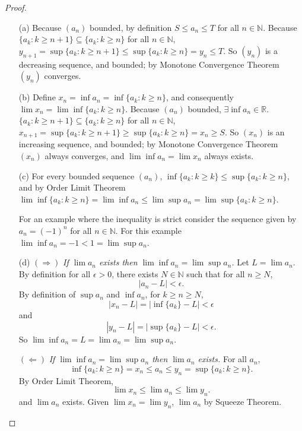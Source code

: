 \documentclass[11pt,twoside, reqno]{amsart}
\theoremstyle{remark}
\def\R{\mathbb R}
\def\N{\mathbb N}
\renewcommand{\implies}{\Rightarrow}
\newcommand{\implied}{\Leftarrow}
\begin{document}
\begin{proof}
\begin{enumerate}
    \item [(a)] Because $(a_n)$ bounded, by definition $S \leq a_n \leq T$ for all $n \in \N$. Because $\{a_k : k \geq n+1\} \subseteq \{a_k : k \geq n\}$ for all $n \in \N$, $y_{n+1} = \sup\{a_k : k \geq n+1\} \leq \sup\{a_k : k \geq n\} = y_n \leq T$. So $(y_n)$ is a decreasing sequence, and bounded; by Monotone Convergence Theorem $(y_n)$ converges.
    \item [(b)] Define $x_n = \inf a_n = \inf \{a_k : k \geq n\}$, and consequently $\lim x_n = \lim \inf \{a_k : k \geq n\}$. Because $(a_n)$ bounded, $\exists \inf a_n \in \R$. $\{a_k : k \geq n+1\} \subseteq \{a_k : k \geq n\}$ for all $n \in \N$, $x_{n+1} = \sup\{a_k : k \geq n+1\} \geq \sup\{a_k : k \geq n\} = x_n \geq S$. So $(x_n)$ is an increasing sequence, and bounded; by Monotone Convergence Theorem $(x_n)$ always converges, and $\lim \inf a_n = \lim x_n$ always exists.
    \item [(c)] For every bounded sequence $(a_n)$, $\inf \{a_k : k \geq k\} \leq \sup \{a_k : k \geq n\}$, and by Order Limit Theorem $\lim \inf \{a_k : k \geq n\} = \lim \inf a_n \leq \lim \sup a_n = \lim \sup \{a_k : k \geq n\}$.
    
    For an example where the inequality is strict consider the sequence given by $a_n = (-1)^n$ for all $n \in \N$. For this example $\lim \inf a_n = -1 < 1 = \lim \sup a_n$.
    \item [(d)] $(\implies)$ \textit{If $\lim a_n$ exists then $\lim \inf a_n = \lim \sup a_n$.} Let $L = \lim a_n$. By definition for all $\epsilon > 0$, there exists $N \in \N$ such that for all $n \geq N$, 
    $$
        |a_n - L| < \epsilon.
    $$
    By definition of $\sup a_n$ and $\inf a_n$, for $k \geq n \geq N$,
    $$
        |x_n - L| = |\inf \{a_k\} - L| < \epsilon
    $$
    and
    $$
        |y_n - L| = |\sup \{a_k\} - L| < \epsilon.
    $$
    So $\lim \inf a_n = L = \lim a_n = \lim \sup a_n$.
    
    $(\implied)$ \textit{If $\lim \inf a_n = \lim \sup a_n$ then $\lim a_n$ exists.} For all $a_n$, 
    $$
        \inf \{a_k : k \geq n\} = x_n \leq a_n \leq y_n = \sup \{a_k : k \geq n\}.
    $$
    By Order Limit Theorem, 
    $$
        \lim x_n \leq \lim a_n \leq \lim y_n.
    $$
    and $\lim a_n$ exists. Given $\lim x_n = \lim y_n$, $\lim a_n$ by Squeeze Theorem.
\end{enumerate}

\end{proof}
\end{document}
